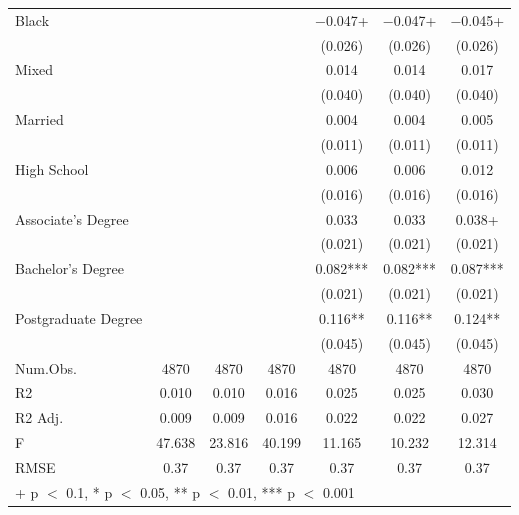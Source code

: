\documentclass[
]{article}
\begin{document}
\begin{table}
{\begin{tabular}[t]{lcccccc}
Black &  &  &  & \num{-0.047}+ & \num{-0.047}+ & \num{-0.045}+\\
 &  &  &  & (\num{0.026}) & (\num{0.026}) & (\num{0.026})\\
Mixed &  &  &  & \num{0.014} & \num{0.014} & \num{0.017}\\
 &  &  &  & (\num{0.040}) & (\num{0.040}) & (\num{0.040})\\
Married &  &  &  & \num{0.004} & \num{0.004} & \num{0.005}\\
 &  &  &  & (\num{0.011}) & (\num{0.011}) & (\num{0.011})\\
High
School &  &  &  & \num{0.006} & \num{0.006} & \num{0.012}\\
 &  &  &  & (\num{0.016}) & (\num{0.016}) & (\num{0.016})\\
Associate's
Degree &  &  &  & \num{0.033} & \num{0.033} & \num{0.038}+\\
 &  &  &  & (\num{0.021}) & (\num{0.021}) & \vphantom{1} (\num{0.021})\\
Bachelor's
Degree &  &  &  & \num{0.082}*** & \num{0.082}*** & \num{0.087}***\\
 &  &  &  & (\num{0.021}) & (\num{0.021}) & (\num{0.021})\\
Postgraduate
Degree &  &  &  & \num{0.116}** & \num{0.116}** & \num{0.124}**\\
 &  &  &  & (\num{0.045}) & (\num{0.045}) & (\num{0.045})\\
\midrule
Num.Obs. & \num{4870} & \num{4870} & \num{4870} & \num{4870} & \num{4870} & \num{4870}\\
R2 & \num{0.010} & \num{0.010} & \num{0.016} & \num{0.025} & \num{0.025} & \num{0.030}\\
R2 Adj. & \num{0.009} & \num{0.009} & \num{0.016} & \num{0.022} & \num{0.022} & \num{0.027}\\
F & \num{47.638} & \num{23.816} & \num{40.199} & \num{11.165} & \num{10.232} & \num{12.314}\\
RMSE & \num{0.37} & \num{0.37} & \num{0.37} & \num{0.37} & \num{0.37} & \num{0.37}\\
\bottomrule
\multicolumn{7}{l}{\rule{0pt}{1em}+ p $<$ 0.1, * p $<$ 0.05, ** p $<$ 0.01, *** p $<$ 0.001}\\
\end{tabular}}
\end{table}
\end{document}
